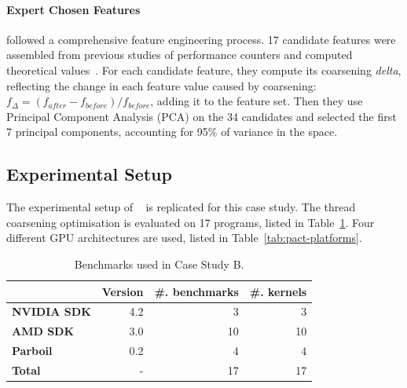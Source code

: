 

\paragraph*{Expert Chosen Features}

\citeauthor{Magni2014} followed a comprehensive feature engineering process. 17 candidate features were assembled from previous studies of performance counters and computed theoretical values~\cite{Magni2,Sim2012}. For each candidate feature, they compute its coarsening \emph{delta}, reflecting the change in each feature value caused by coarsening: $f_{\Delta} = (f_{after} - f_{before}) / f_{before}$, adding it to the feature set. Then they use Principal Component Analysis (PCA) on the 34 candidates and selected the first 7 principal components, accounting for 95\% of variance in the space.

\subsection{Experimental Setup}

The experimental setup of \citeauthor{Magni2014}~\cite{Magni2014} is replicated for this case study. The thread coarsening optimisation is evaluated on 17 programs, listed in Table~\ref{tab:pact-benchmarks}. Four different GPU architectures are used, listed in Table~\ref{tab:pact-platforms}.

\begin{table}
  \centering %
  \begin{tabular}{| l r r r |}
    \hline
    \rowcolor{gray!50}
    & \textbf{Version} & \textbf{\#. benchmarks} & \textbf{\#. kernels}\\
    \hline
    \textbf{NVIDIA SDK} & 4.2 & 3 & 3 \\
    \textbf{AMD SDK} & 3.0 & 10 & 10 \\
    \textbf{Parboil~\cite{Stratton2012}} & 0.2 & 4 & 4 \\
    \textbf{Total} & - & 17 & 17 \\
    \hline
  \end{tabular}
  \caption[Benchmarks used in Case Study B]{%
    Benchmarks used in Case Study B.%
  }
  \label{tab:pact-benchmarks}
\end{table}


